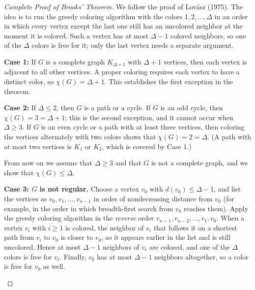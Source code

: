 \documentclass{article}
\theoremstyle{definition}
\begin{document}
\begin{proof}[Complete Proof of Brooks' Theorem]
We follow the proof of Lov\'asz (1975). The idea is to run the greedy coloring algorithm with the colors $1, 2, \ldots, \Delta$ in an order in which every vertex except the last one still has an uncolored neighbor at the moment it is colored. Such a vertex has at most $\Delta - 1$ colored neighbors, so one of the $\Delta$ colors is free for it; only the last vertex needs a separate argument.

\textbf{Case 1:} If $G$ is a complete graph $K_{\Delta+1}$ with $\Delta+1$ vertices, then each vertex is adjacent to all other vertices. A proper coloring requires each vertex to have a distinct color, so $\chi(G) = \Delta+1$. This establishes the first exception in the theorem.

\textbf{Case 2:} If $\Delta \leq 2$, then $G$ is a path or a cycle. If $G$ is an odd cycle, then $\chi(G) = 3 = \Delta+1$; this is the second exception, and it cannot occur when $\Delta \geq 3$. If $G$ is an even cycle or a path with at least three vertices, then coloring the vertices alternately with two colors shows that $\chi(G) = 2 = \Delta$. (A path with at most two vertices is $K_1$ or $K_2$, which is covered by Case 1.)

From now on we assume that $\Delta \geq 3$ and that $G$ is not a complete graph, and we show that $\chi(G) \leq \Delta$.

\textbf{Case 3: $G$ is not regular.} Choose a vertex $v_0$ with $d(v_0) \leq \Delta - 1$, and list the vertices as $v_0, v_1, \ldots, v_{n-1}$ in order of nondecreasing distance from $v_0$ (for example, in the order in which breadth-first search from $v_0$ reaches them). Apply the greedy coloring algorithm in the \textit{reverse} order $v_{n-1}, v_{n-2}, \ldots, v_1, v_0$. When a vertex $v_i$ with $i \geq 1$ is colored, the neighbor of $v_i$ that follows it on a shortest path from $v_i$ to $v_0$ is closer to $v_0$, so it appears earlier in the list and is still uncolored. Hence at most $\Delta - 1$ neighbors of $v_i$ are colored, and one of the $\Delta$ colors is free for $v_i$. Finally, $v_0$ has at most $\Delta - 1$ neighbors altogether, so a color is free for $v_0$ as well.

\begin{figure}[ht]
\centering
{}
\end{figure}
\end{proof}
\end{document}
